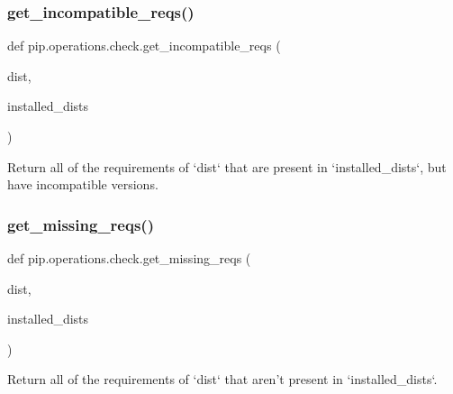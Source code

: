 \subsubsection{\texorpdfstring{get\+\_\+incompatible\+\_\+reqs()}{get\_incompatible\_reqs()}}
{\footnotesize\ttfamily def pip.\+operations.\+check.\+get\+\_\+incompatible\+\_\+reqs (\begin{DoxyParamCaption}\item[{}]{dist,  }\item[{}]{installed\+\_\+dists }\end{DoxyParamCaption})}

\begin{DoxyVerb}Return all of the requirements of `dist` that are present in
`installed_dists`, but have incompatible versions.\end{DoxyVerb}
 \mbox{\label{namespacepip_1_1operations_1_1check_a8144e204678212ff692cc906ad803418}} 
\subsubsection{\texorpdfstring{get\+\_\+missing\+\_\+reqs()}{get\_missing\_reqs()}}
{\footnotesize\ttfamily def pip.\+operations.\+check.\+get\+\_\+missing\+\_\+reqs (\begin{DoxyParamCaption}\item[{}]{dist,  }\item[{}]{installed\+\_\+dists }\end{DoxyParamCaption})}

\begin{DoxyVerb}Return all of the requirements of `dist` that aren't present in
`installed_dists`.\end{DoxyVerb}
 